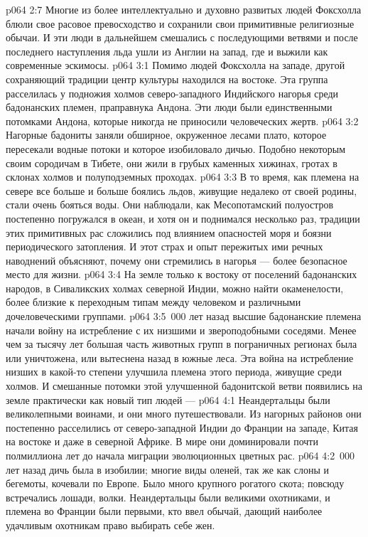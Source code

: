 \vs p064 2:7 Многие из более интеллектуально и духовно развитых людей Фоксхолла блюли свое расовое превосходство и сохранили свои примитивные религиозные обычаи. И эти люди в дальнейшем смешались с последующими ветвями и после последнего наступления льда ушли из Англии на запад, где и выжили как современные эскимосы.
\vs p064 3:1 Помимо людей Фоксхолла на западе, другой сохраняющий традиции центр культуры находился на востоке. Эта группа расселилась у подножия холмов северо\hyp{}западного Индийского нагорья среди бадонанских племен, праправнука Андона. Эти люди были единственными потомками Андона, которые никогда не приносили человеческих жертв.
\vs p064 3:2 Нагорные бадониты заняли обширное, окруженное лесами плато, которое пересекали водные потоки и которое изобиловало дичью. Подобно некоторым своим сородичам в Тибете, они жили в грубых каменных хижинах, гротах в склонах холмов и полуподземных проходах.
\vs p064 3:3 В то время, как племена на севере все больше и больше боялись льдов, живущие недалеко от своей родины, стали очень бояться воды. Они наблюдали, как Месопотамский полуостров постепенно погружался в океан, и хотя он и поднимался несколько раз, традиции этих примитивных рас сложились под влиянием опасностей моря и боязни периодического затопления. И этот страх и опыт пережитых ими речных наводнений объясняют, почему они стремились в нагорья --- более безопасное место для жизни.
\vs p064 3:4 На земле только к востоку от поселений бадонанских народов, в Сиваликских холмах северной Индии, можно найти окаменелости, более близкие к переходным типам между человеком и различными дочеловеческими группами.
\vs p064 3:5 \,000 лет назад высшие бадонанские племена начали войну на истребление с их низшими и звероподобными соседями. Менее чем за тысячу лет большая часть животных групп в пограничных регионах была или уничтожена, или вытеснена назад в южные леса. Эта война на истребление низших в какой\hyp{}то степени улучшила племена этого периода, живущие среди холмов. И смешанные потомки этой улучшенной бадонитской ветви появились на земле практически как новый тип людей --- 
\vs p064 4:1 Неандертальцы были великолепными воинами, и они много путешествовали. Из нагорных районов они постепенно расселились от северо\hyp{}западной Индии до Франции на западе, Китая на востоке и даже в северной Африке. В мире они доминировали почти полмиллиона лет до начала миграции эволюционных цветных рас.
\vs p064 4:2 \,000 лет назад дичь была в изобилии; многие виды оленей, так же как слоны и бегемоты, кочевали по Европе. Было много крупного рогатого скота; повсюду встречались лошади, волки. Неандертальцы были великими охотниками, и племена во Франции были первыми, кто ввел обычай, дающий наиболее удачливым охотникам право выбирать себе жен.
